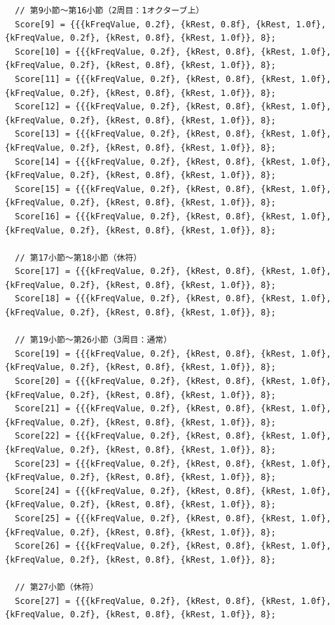 \begin{lstlisting}
  // 第9小節〜第16小節（2周目：1オクターブ上）
  Score[9] = {{{kFreqValue, 0.2f}, {kRest, 0.8f}, {kRest, 1.0f}, {kFreqValue, 0.2f}, {kRest, 0.8f}, {kRest, 1.0f}}, 8};
  Score[10] = {{{kFreqValue, 0.2f}, {kRest, 0.8f}, {kRest, 1.0f}, {kFreqValue, 0.2f}, {kRest, 0.8f}, {kRest, 1.0f}}, 8};
  Score[11] = {{{kFreqValue, 0.2f}, {kRest, 0.8f}, {kRest, 1.0f}, {kFreqValue, 0.2f}, {kRest, 0.8f}, {kRest, 1.0f}}, 8};
  Score[12] = {{{kFreqValue, 0.2f}, {kRest, 0.8f}, {kRest, 1.0f}, {kFreqValue, 0.2f}, {kRest, 0.8f}, {kRest, 1.0f}}, 8};
  Score[13] = {{{kFreqValue, 0.2f}, {kRest, 0.8f}, {kRest, 1.0f}, {kFreqValue, 0.2f}, {kRest, 0.8f}, {kRest, 1.0f}}, 8};
  Score[14] = {{{kFreqValue, 0.2f}, {kRest, 0.8f}, {kRest, 1.0f}, {kFreqValue, 0.2f}, {kRest, 0.8f}, {kRest, 1.0f}}, 8};
  Score[15] = {{{kFreqValue, 0.2f}, {kRest, 0.8f}, {kRest, 1.0f}, {kFreqValue, 0.2f}, {kRest, 0.8f}, {kRest, 1.0f}}, 8};
  Score[16] = {{{kFreqValue, 0.2f}, {kRest, 0.8f}, {kRest, 1.0f}, {kFreqValue, 0.2f}, {kRest, 0.8f}, {kRest, 1.0f}}, 8};

  // 第17小節〜第18小節（休符）
  Score[17] = {{{kFreqValue, 0.2f}, {kRest, 0.8f}, {kRest, 1.0f}, {kFreqValue, 0.2f}, {kRest, 0.8f}, {kRest, 1.0f}}, 8};
  Score[18] = {{{kFreqValue, 0.2f}, {kRest, 0.8f}, {kRest, 1.0f}, {kFreqValue, 0.2f}, {kRest, 0.8f}, {kRest, 1.0f}}, 8};

  // 第19小節〜第26小節（3周目：通常）
  Score[19] = {{{kFreqValue, 0.2f}, {kRest, 0.8f}, {kRest, 1.0f}, {kFreqValue, 0.2f}, {kRest, 0.8f}, {kRest, 1.0f}}, 8};
  Score[20] = {{{kFreqValue, 0.2f}, {kRest, 0.8f}, {kRest, 1.0f}, {kFreqValue, 0.2f}, {kRest, 0.8f}, {kRest, 1.0f}}, 8};
  Score[21] = {{{kFreqValue, 0.2f}, {kRest, 0.8f}, {kRest, 1.0f}, {kFreqValue, 0.2f}, {kRest, 0.8f}, {kRest, 1.0f}}, 8};
  Score[22] = {{{kFreqValue, 0.2f}, {kRest, 0.8f}, {kRest, 1.0f}, {kFreqValue, 0.2f}, {kRest, 0.8f}, {kRest, 1.0f}}, 8};
  Score[23] = {{{kFreqValue, 0.2f}, {kRest, 0.8f}, {kRest, 1.0f}, {kFreqValue, 0.2f}, {kRest, 0.8f}, {kRest, 1.0f}}, 8};
  Score[24] = {{{kFreqValue, 0.2f}, {kRest, 0.8f}, {kRest, 1.0f}, {kFreqValue, 0.2f}, {kRest, 0.8f}, {kRest, 1.0f}}, 8};
  Score[25] = {{{kFreqValue, 0.2f}, {kRest, 0.8f}, {kRest, 1.0f}, {kFreqValue, 0.2f}, {kRest, 0.8f}, {kRest, 1.0f}}, 8};
  Score[26] = {{{kFreqValue, 0.2f}, {kRest, 0.8f}, {kRest, 1.0f}, {kFreqValue, 0.2f}, {kRest, 0.8f}, {kRest, 1.0f}}, 8};

  // 第27小節（休符）
  Score[27] = {{{kFreqValue, 0.2f}, {kRest, 0.8f}, {kRest, 1.0f}, {kFreqValue, 0.2f}, {kRest, 0.8f}, {kRest, 1.0f}}, 8};


\end{lstlisting}
